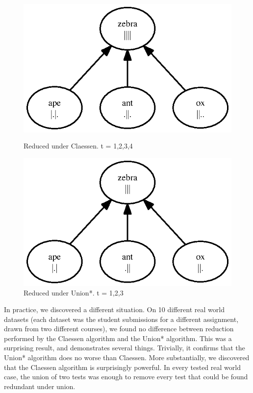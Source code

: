 \documentclass[11pt,twoside]{article}
\begin{document}
\begin{figure}

\includegraphics{toy.ps}
\caption{Reduced under Claessen. t = {1,2,3,4}}
\includegraphics{toyb.ps}
\caption{Reduced under Union*. t = {1,2,3}}
\end{figure}


In practice, we discovered a different situation. On 10 different real world datasets (each dataset was the student submissions for a different assignment, drawn from two different courses), we found no difference between reduction performed by the Claessen algorithm and the Union* algorithm. This was a surprising result, and demonstrates several things. Trivially, it confirms that the Union* algorithm does no worse than Claessen. More substantially, we discovered that the Claessen algorithm is surprisingly powerful. In every tested real world case, the union of two tests was enough to remove every test that could be found redundant under union.
\end{document}
